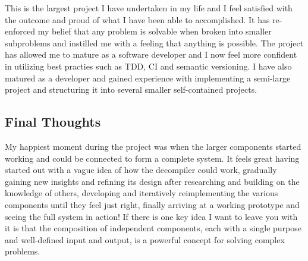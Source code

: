 This is the largest project I have undertaken in my life and I feel satisfied with the outcome and proud of what I have been able to accomplished. It has re-enforced my belief that any problem is solvable when broken into smaller subproblems and instilled me with a feeling that anything is possible. The project has allowed me to mature as a software developer and I now feel more confident in utilizing best practies such as TDD, CI and semantic versioning. I have also matured as a developer and gained experience with implementing a semi-large project and structuring it into several smaller self-contained projects.


\subsection{Final Thoughts}

My happiest moment during the project was when the larger components started working and could be connected to form a complete system. It feels great having started out with a vague idea of how the decompiler could work, gradually gaining new insights and refining its design after researching and building on the knowledge of others, developing and iteratively reimplementing the various components until they feel just right, finally arriving at a working prototype and seeing the full system in action! If there is one key idea I want to leave you with it is that the composition of independent components, each with a single purpose and well-defined input and output, is a powerful concept for solving complex problems.
